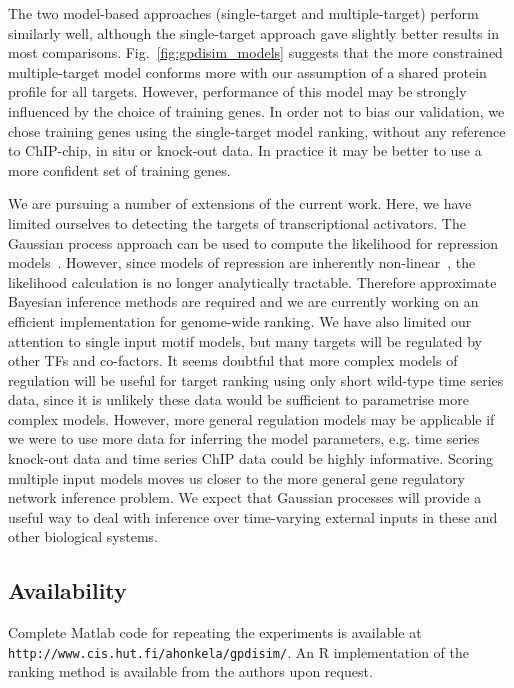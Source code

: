 \documentclass{pnastwo}
\begin{document}
\begin{article}
The two model-based approaches (single-target and multiple-target) perform 
similarly well, although the single-target approach gave slightly better results in 
most comparisons. Fig.~\ref{fig:gpdisim_models} suggests that the more constrained 
multiple-target model conforms more with our assumption of a shared protein 
profile for all targets. However, performance of this model may be strongly
influenced by the choice of training genes. In order not to bias our validation, 
we chose training genes using the single-target model ranking, without any reference
to ChIP-chip, in situ or knock-out data. In practice it may be better to use a more 
confident set of training genes. 

We are pursuing a number of extensions of the current work. Here, we
have limited ourselves to detecting the targets of transcriptional activators. The
Gaussian process approach can be used to compute the likelihood for
repression models~\cite{Gao2008}. However, since models of repression
are inherently non-linear~\cite{Khanin2006}, the likelihood calculation is no longer analytically
tractable. Therefore approximate Bayesian inference methods are
required and we are currently working on an efficient implementation
for genome-wide ranking. We have also limited our attention
to single input motif models, but many targets will be regulated by other TFs and
co-factors. It seems doubtful that more complex models of regulation
will be useful for target ranking using only short wild-type time
series data, since it is unlikely these data would be sufficient to parametrise more complex models. However,
more general regulation models may be applicable if we were to use more data for
inferring the model parameters, e.g. time series knock-out data and time series
ChIP data could be highly informative. Scoring multiple input
models moves us closer to the more general gene regulatory network inference
problem. We expect that Gaussian processes will provide a useful way
to deal with inference over time-varying external inputs in these and other
biological systems.

\subsection{Availability}
Complete Matlab code for repeating the experiments is available at
\texttt{http://www.cis.hut.fi/ahonkela/gpdisim/}.  An R implementation of
the ranking method is available from the authors upon request.

\begin{materials}

\end{materials}
\end{article}
\end{document}
